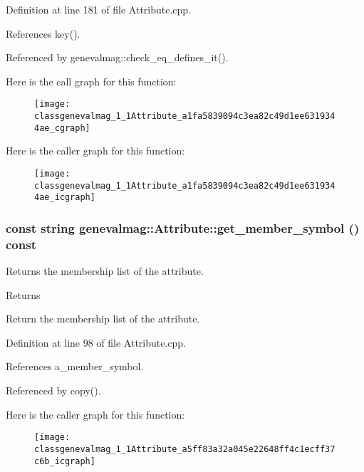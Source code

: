 Definition at line 181 of file Attribute.cpp.



References key().



Referenced by genevalmag::check\_\-eq\_\-defines\_\-it().



Here is the call graph for this function:\nopagebreak
\begin{figure}[H]
\begin{center}
\leavevmode
\texttt{[image: classgenevalmag\_1\_1Attribute\_a1fa5839094c3ea82c49d1ee6319344ae\_cgraph]}
\end{center}
\end{figure}




Here is the caller graph for this function:\nopagebreak
\begin{figure}[H]
\begin{center}
\leavevmode
\texttt{[image: classgenevalmag\_1\_1Attribute\_a1fa5839094c3ea82c49d1ee6319344ae\_icgraph]}
\end{center}
\end{figure}


\hypertarget{classgenevalmag_1_1Attribute_a5ff83a32a045e22648ff4c1ecff37c6b}{
\subsubsection[{get\_\-member\_\-symbol}]{\setlength{\rightskip}{0pt plus 5cm}const string genevalmag::Attribute::get\_\-member\_\-symbol () const}}
\label{classgenevalmag_1_1Attribute_a5ff83a32a045e22648ff4c1ecff37c6b}
Returns the membership list of the attribute. \begin{DoxyReturn}{Returns}

\end{DoxyReturn}
Return the membership list of the attribute. 

Definition at line 98 of file Attribute.cpp.



References a\_\-member\_\-symbol.



Referenced by copy().



Here is the caller graph for this function:\nopagebreak
\begin{figure}[H]
\begin{center}
\leavevmode
\texttt{[image: classgenevalmag\_1\_1Attribute\_a5ff83a32a045e22648ff4c1ecff37c6b\_icgraph]}
\end{center}
\end{figure}


